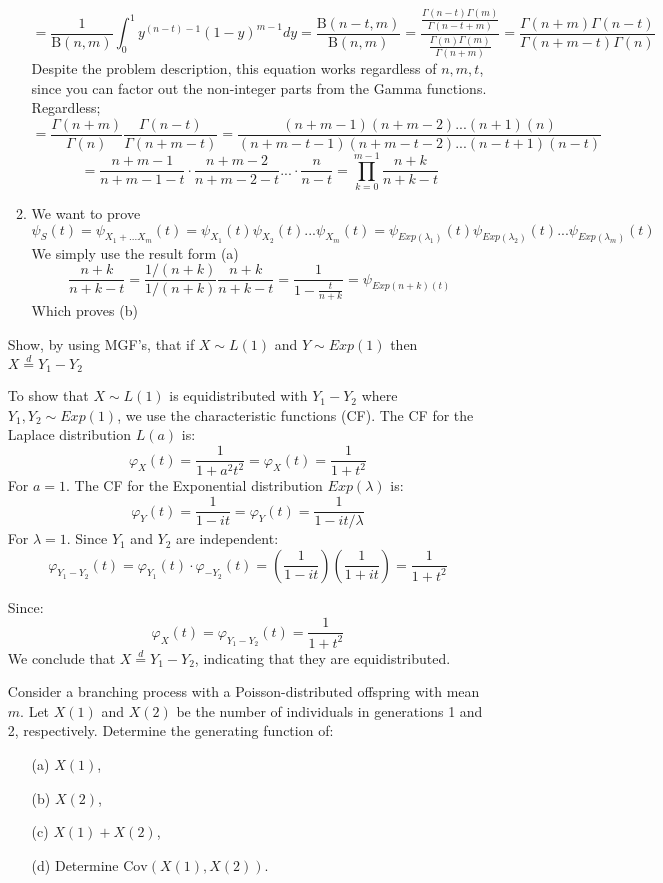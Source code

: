 \begin{enumerate}[label=(\alph*)]
\begin{enumerate}
\[
    = \frac{1}{\mathrm{B}(n,m)} \int_{0}^{1} y^{(n-t)-1} (1-y)^{m-1} dy = \frac{\mathrm{B}(n-t,m)}{\mathrm{B}(n,m)} = \frac{\frac{\Gamma(n-t)\Gamma(m)}{\Gamma(n-t+m)}}{\frac{\Gamma(n)\Gamma(m)}{\Gamma(n+m)}} =
     \frac{\Gamma(n+m)\Gamma(n-t)}{\Gamma(n+m-t)\Gamma(n)}
\]
Despite the problem description, this equation works regardless of $n,m,t$, since you can factor out the non-integer parts from the Gamma functions. Regardless; 
\[
    =\frac{\Gamma(n+m)}{\Gamma(n)} \frac{\Gamma(n-t)}{\Gamma(n+m-t)} = \frac{(n+m-1)(n+m-2)...(n+1)(n) }{(n+m-t-1)(n+m-t-2)...(n-t+1)(n-t)}
\]
\[
    = \frac{n+m-1}{n+m-1-t}\cdot\frac{n+m-2}{n+m-2-t} ...\cdot\frac{n}{n-t} = \prod_{k=0}^{m-1} \frac{n+k}{n+k-t}
\]
\item We want to prove \[
  \psi_S(t) = \psi_{X_1 + ... X_m}(t) = \psi_{X_1}(t)\psi_{X_2}(t)...\psi_{X_m}(t) = \psi_{Exp(\lambda_1)}(t)\psi_{Exp(\lambda_2)}(t)...\psi_{Exp(\lambda_m)}(t)
\]
We simply use the result form (a)
\[ 
    \frac{n+k}{n+k-t} = \frac{1/(n+k)}{1/(n+k)} \frac{n+k}{n+k-t} = \frac{1}{1-\frac{t}{n+k}} = \psi_{Exp(n+k)(t)}
\]
Which proves (b)
\end{enumerate}

\problem %
 Show, by using MGF's, that if $X \sim L(1)$ and $Y \sim Exp(1)$ then $X \overset{d}{=} Y_1 - Y_2$




To show that $X \sim L(1)$ is equidistributed with $Y_1 - Y_2$ where $Y_1, Y_2 \sim Exp(1)$, we use the characteristic functions (CF).
\solution
The CF for the Laplace distribution $L(a)$ is:
\[
\varphi_X(t) = \frac{1}{1 + a^2 t^2} = \varphi_X(t) = \frac{1}{1 + t^2}
\]
For $a=1$. The CF for the Exponential distribution $Exp(\lambda)$ is:
\[
\varphi_Y(t) = \frac{1}{1 - it} =
\varphi_Y(t) = \frac{1}{1 - it/\lambda}
\]
For $\lambda=1$. Since $Y_1$ and $Y_2$ are independent:
\[
\varphi_{Y_1 - Y_2}(t) = \varphi_{Y_1}(t) \cdot \varphi_{-Y_2}(t) = \left(\frac{1}{1 - it}\right) \left(\frac{1}{1 + it}\right) = \frac{1}{1 + t^2}
\]

Since:
\[
\varphi_X(t) = \varphi_{Y_1 - Y_2}(t) = \frac{1}{1 + t^2}
\]
We conclude that $X \overset{d}{=} Y_1 - Y_2$, indicating that they are equidistributed.


\setcounter{problem}{42}



\setcounter{problem}{42}

\problem Consider a branching process with a Poisson-distributed offspring with mean \( m \). Let \( X(1) \) and \( X(2) \) be the number of individuals in generations 1 and 2, respectively. Determine the generating function of:
\begin{itemize}
    \item[(a)] \( X(1) \),
    \item[(b)] \( X(2) \),
    \item[(c)] \( X(1) + X(2) \),
    \item[(d)] Determine \( \text{Cov}(X(1), X(2)) \).
\end{itemize}


\end{enumerate}
